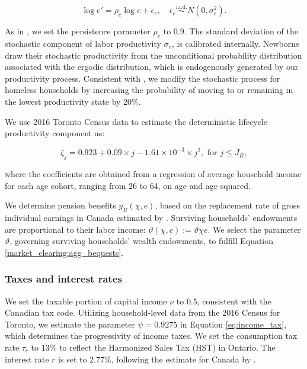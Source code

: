\documentclass[parskip=full]{article}
\begin{document}
\begin{equation*}
  \log e' = \rho_{e} \log e + \epsilon_{e},\quad \epsilon_{e}\overset{\mathrm{i.i.d.}} \sim N(0,\sigma^2_{e}).
\end{equation*}

\noindent As in \citet{gkkoc}, we set the persistence parameter $\rho_{e}$ to 0.9. The standard deviation of the stochastic component of labor productivity $\sigma_{e}$, is calibrated internally. Newborns draw their stochastic productivity from the unconditional probability distribution associated with the ergodic distribution, which is endogenously generated by our productivity process. Consistent with \citet{az-2024}, we modify the stochastic process for homeless households by increasing the probability of moving to or remaining in the lowest productivity state by 20\%.  

We use 2016 Toronto Census data to estimate the deterministic lifecycle productivity component as:

\begin{equation*}
\zeta_j = 0.923+0.09\times j-1.61\times 10^{-3}\times j^{2}, \mbox{ for } j\leq J_{R},
\end{equation*}

\noindent where the coefficients are obtained from a regression of average household income for each age cohort, ranging from 26 to 64, on age and age squared. 

We determine pension benefits ${y_{R}(\chi,e)}$, based on the replacement rate of gross individual earnings in Canada estimated by \citet{OECD-pension}. Surviving households' endowments are proportional to their labor income: $\vartheta(\chi,e):=\vartheta \chi e$. We select the parameter $\vartheta$, governing surviving households' wealth endowments, to fulfill Equation \eqref{market_clearing:agg_bequests}.

\subsubsection{Taxes and interest rates}

We set the taxable portion of capital income $\nu$ to $0.5$, consistent with the Canadian tax code. Utilizing household-level data from the 2016 Census for Toronto, we estimate the parameter $\psi=0.9275$ in Equation \eqref{eq:income_tax}, which determines the progressivity of income taxes. We set the consumption tax rate $\tau_{c}$ to 13\% to reflect the Harmonized Sales Tax (HST) in Ontario. The interest rate $r$ is set to $2.77\%$, following the estimate for Canada by \citet{bruneau-etal-2018}.
\end{document}
